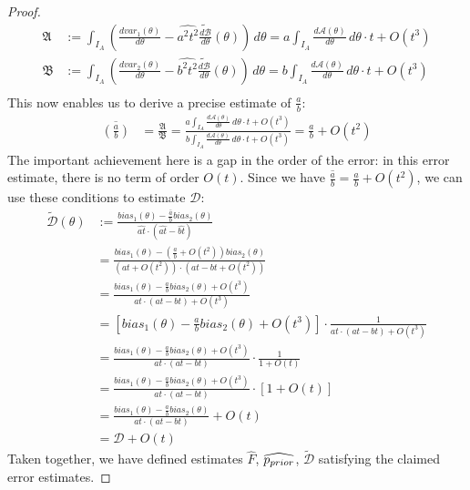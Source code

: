 \begin{proof}
\begin{align*}
    \mathfrak{A} &:= \int_{I_A}\left(\frac{d var_1(\theta)}{d \theta} - \widehat{a^2t^2} \tilde{\frac{d \mathcal{B}}{d \theta}}(\theta)\right)\,d\theta
    = a\int_{I_A}\frac{d \mathcal{A}(\theta)}{d \theta}\,d\theta \cdot t + O(t^3) \\
    \mathfrak{B} &:= \int_{I_A}\left(\frac{d var_2(\theta)}{d \theta} - \widehat{b^2t^2} \tilde{\frac{d \mathcal{B}}{d \theta}}(\theta)\right)\,d\theta
    = b\int_{I_A}\frac{d \mathcal{A}(\theta)}{d \theta}\,d\theta \cdot t + O(t^3)\\
    \end{align*}    
    This now enables us to derive a precise estimate of $\frac{a}{b}$:
    \begin{align*}
    \overline{(\frac{a}{b})} &= \frac{\mathfrak{A}}{\mathfrak{B}}
    = \frac{a\int_{I_A}\frac{d \mathcal{A}(\theta)}{d \theta}\,d\theta \cdot t + O(t^3)}{b\int_{I_A}\frac{d \mathcal{A}(\theta)}{d \theta}\,d\theta \cdot t + O(t^3)}
    = \frac{a}{b}+O(t^2)
\end{align*}
The important achievement here is a gap in the order of the error: in this error estimate, there is no term of order $O(t)$.
Since we have $\overline{\frac{a}{b}} = \frac{a}{b} + O(t^2)$, we can use these conditions to estimate $\mathcal{D}$:
\begin{align*}
    \tilde{\mathcal{D}}(\theta) &:= \frac{bias_1(\theta) - \overline{\frac{a}{b}}bias_2(\theta)}{\widehat{at} \cdot (\widehat{at} - \widehat{bt})}\\
    &= \frac{bias_1(\theta) - (\frac{a}{b} + O(t^2))bias_2(\theta)}{(at+O(t^2)) \cdot (at - bt + O(t^2))}\\
    &= \frac{bias_1(\theta) - \frac{a}{b}bias_2(\theta) + O(t^3)}{at \cdot (at - bt) + O(t^3)}\\
    &= [bias_1(\theta) - \frac{a}{b}bias_2(\theta) + O(t^3)] \cdot \frac{1}{at \cdot (at - bt) + O(t^3)}\\
    &=\frac{bias_1(\theta) - \frac{a}{b}bias_2(\theta) + O(t^3)}{at \cdot (at - bt)} \cdot \frac{1}{1 + O(t)}\\
    &= \frac{bias_1(\theta) - \frac{a}{b}bias_2(\theta) + O(t^3)}{at \cdot (at - bt)} \cdot [1+O(t)]\\
    &= \frac{bias_1(\theta) - \frac{a}{b}bias_2(\theta)}{at \cdot (at - bt)} + O(t)\\
    &= \mathcal{D} + O(t)
\end{align*}
Taken together, we have defined estimates $\widehat{F}$, $\widehat{p_{prior}}$, $\tilde{\mathcal{D}}$ satisfying the claimed error estimates.
\end{proof}


